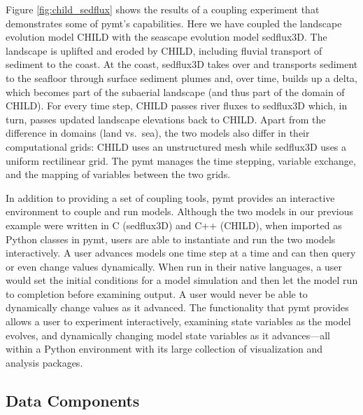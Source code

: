 \documentclass[journal abbreviation, manuscript]{copernicus}
\begin{document}
Figure \ref{fig:child_sedflux} shows the results of a coupling experiment
that demonstrates some of pymt's capabilities.
Here we have coupled the landscape evolution model CHILD with
the seascape evolution model sedflux3D. The landscape
is uplifted and eroded by CHILD, including fluvial transport of sediment to the coast. At the coast, sedflux3D takes over and transports sediment to the seafloor through surface sediment plumes and, over time, builds up a delta, which becomes part of
the subaerial landscape (and thus part of the domain of CHILD). For every time step, CHILD passes river fluxes
to sedflux3D which, in turn, passes updated landscape elevations back to CHILD.
Apart from the difference in domains (land vs.\ sea), the two models also differ in their computational grids: CHILD uses an unstructured mesh while sedflux3D uses a uniform rectilinear grid. The pymt manages the time stepping, variable exchange, and the mapping of variables between the two grids.

In addition to providing a set of coupling tools, pymt provides
an interactive environment to couple and run models. Although the two models in
our previous example were written in C (sedflux3D) and C++ (CHILD), when imported as Python classes in pymt, users are able to instantiate and 
run the two models interactively. A user advances models one time step at a time and can then
query or even change values dynamically. When run in their native languages, a user
would set the initial conditions for a model simulation and then let the model run
to completion before examining output. A user would never be able to dynamically change values as it advanced. The  functionality that pymt provides 
allows a user to experiment interactively, examining state variables
as the model evolves, and 
dynamically changing model state variables as it advances---all within a Python
environment with its large  collection of visualization and analysis packages.


\subsection{Data Components}
\end{document}
